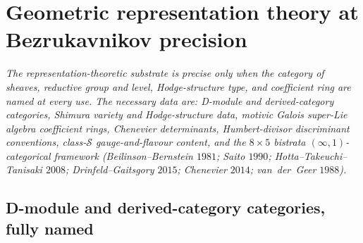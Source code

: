 \section{Geometric representation theory at Bezrukavnikov precision}
\label{wn:sec:spine-third-pass}

\emph{The representation-theoretic substrate is precise only when the
category of sheaves, reductive group and level, Hodge-structure type,
and coefficient ring are named at every use.  The necessary data are:
D-module and derived-category categories, Shimura variety and
Hodge-structure data, motivic Galois super-Lie algebra coefficient
rings, Chenevier determinants, Humbert-divisor discriminant
conventions, class-$\mathcal{S}$ gauge-and-flavour content, and the
$8\times 5$ bistrata $(\infty,1)$-categorical framework
(Beilinson--Bernstein $1981$; Saito $1990$;
Hotta--Takeuchi--Tanisaki $2008$; Drinfeld--Gaitsgory $2015$;
Chenevier $2014$; van~der~Geer $1988$).}

\subsection{D-module and derived-category categories, fully named}
\label{wn:subsec:third-pass-D-module}

